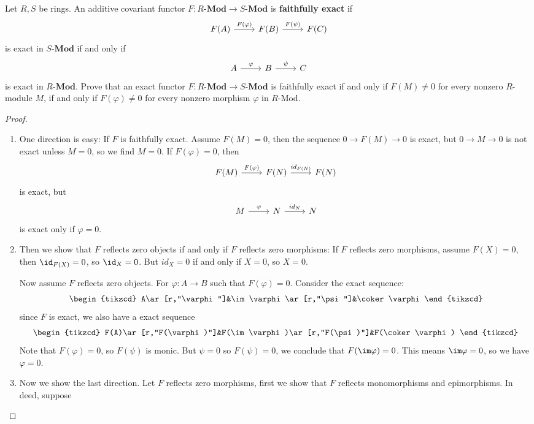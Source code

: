 \begin{exercise}
Let $R,S$ be rings. An additive covariant functor $F:R$-$\mathbf{Mod}\to S$-$\mathbf{Mod}$ is \textbf{faithfully exact} if \[\begin{tikzcd}
F(A)\ar[r,"F(\varphi)"]&F(B)\ar[r,"F(\psi)"]&F(C)
\end{tikzcd}\] 
is exact in $S$-$\mathbf{Mod}$ if and only if 
\[\begin{tikzcd}
A\ar[r,"\varphi"]&B\ar[r,"\psi"]&C
\end{tikzcd}\]
is exact in $R$-$\mathbf{Mod}$. Prove that an exact functor $F:R$-$\mathbf{Mod}\to S$-$\mathbf{Mod}$ is faithfully exact if and only if $F(M)\neq0$ for every nonzero $R$-module $M$, if and only if $F(\varphi)\neq0$ for every nonzero morphism $\varphi$ in $R$-Mod.
\end{exercise}
\begin{proof}
\mbox{}
\begin{enumerate}
\item One direction is easy: If $F$ is faithfully exact. Assume $F(M)=0$, then the sequence $0\to F(M)\to0$ is exact, but $0\to M\to 0$ is not exact unless $M=0$, so we find $M=0$. If $F(\varphi)=0$, then 
\[\begin{tikzcd}
F(M)\ar[r,"F(\varphi)"]&F(N)\ar[r,"id_{F(N)}"]&F(N)
\end{tikzcd}\] 
is exact, but 
\[\begin{tikzcd} 
M\ar[r,"\varphi"]&N\ar[r,"id_N"]&N 
\end{tikzcd}\] 
is exact only if $\varphi=0$.
\item Then we show that $F$ reflects zero objects if and only if $F$ reflects zero morphisms: If $F$ reflects zero morphisms, assume $F(X)=0$, then $\id_{F(X)}=0$, so $\id_X=0$. But $id_X=0$ if and only if $X=0$, so $X=0$.\par 
Now assume $F$ reflects zero objects. For $\varphi:A\to B$ such that $F(\varphi)=0$. Consider the exact sequence:
\[\begin{tikzcd}
A\ar[r,"\varphi"]&\im\varphi\ar[r,"\psi"]&\coker\varphi
\end{tikzcd}\]
since $F$ is exact, we also have a exact sequence
\[\begin{tikzcd}
F(A)\ar[r,"F(\varphi)"]&F(\im\varphi)\ar[r,"F(\psi)"]&F(\coker\varphi)
\end{tikzcd}\]
Note that $F(\varphi)=0$, so $F(\psi)$ is monic. But $\psi=0$ so $F(\psi)=0$, we conclude that $F(\im\varphi)=0$. This means $\im\varphi=0$, so we have $\varphi=0$.
\item Now we show the last direction. Let $F$ reflects zero morphisms, first we show that $F$ reflects monomorphisms and epimorphisms. In deed, suppose

\end{enumerate}
\end{proof}

